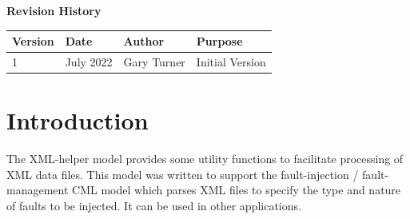 \documentclass[11pt,fleqn]{report}
\begin{document}
\titlePage
\clearpage %
\tableofcontents %
\vfill
{\Large \textbf {Revision History}}
{\large
\begin{center}
\begin{tabular}{|l||l|l|l|}
\hline
 \textbf{Version} & \textbf{Date} & \textbf{Author} & \textbf{Purpose} \\ \hline
 \hline
1 & July 2022 & Gary Turner & Initial Version \\ \hline
\end{tabular}
\end{center}
}

\chapter{Introduction} %
\par The XML-helper model provides some utility functions to facilitate
processing of XML data files. This model was written to support the
fault-injection / fault-management CML model which parses XML files to
specify the type and nature of faults to be injected. It can be used in
other applications.
\end{document}
